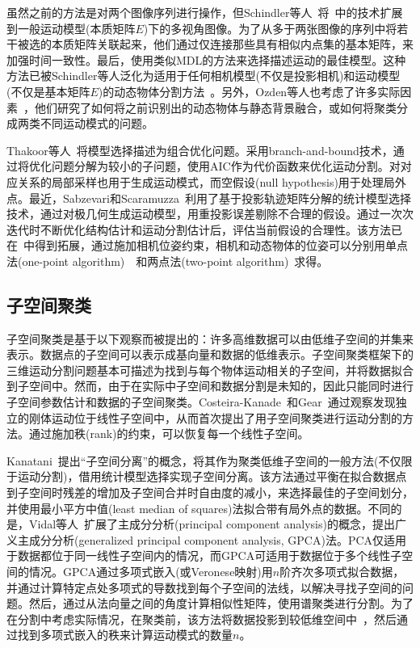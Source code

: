 虽然之前的方法是对两个图像序列进行操作，但Schindler等人~\cite{schindler2006perspective}将~\cite{schindler2005two}中的技术扩展到一般运动模型(本质矩阵$E$)下的多视角图像。为了从多于两张图像的序列中将若干被选的本质矩阵关联起来，他们通过仅连接那些具有相似内点集的基本矩阵，来加强时间一致性。最后，使用类似MDL的方法来选择描述运动的最佳模型。这种方法已被Schindler等人泛化为适用于任何相机模型(不仅是投影相机)和运动模型(不仅是基本矩阵$E$)的动态物体分割方法~\cite{schindler2008model}。另外，Ozden等人也考虑了许多实际因素~\cite{ozden2010multibody}，他们研究了如何将之前识别出的动态物体与静态背景融合，或如何将聚类分成两类不同运动模式的问题。

Thakoor等人~\cite{thakoor2010multibody}将模型选择描述为组合优化问题。采用branch-and-bound技术，通过将优化问题分解为较小的子问题，使用AIC作为代价函数来优化运动分割。对对应关系的局部采样也用于生成运动模式，而空假设(null hypothesis)用于处理局外点。最近，Sabzevari和Scaramuzza~\cite{sabzevari2014monocular}利用了基于投影轨迹矩阵分解的统计模型选择技术，通过对极几何生成运动模型，用重投影误差剔除不合理的假设。通过一次次迭代时不断优化结构估计和运动分割估计后，评估当前假设的合理性。该方法已在~\cite{sabzevari2016multi}中得到拓展，通过施加相机位姿约束，相机和动态物体的位姿可以分别用单点法(one-point algorithm)~\cite{scaramuzza20111}~\cite{scaramuzza2009real}和两点法(two-point algorithm)~\cite{ortin2001indoor}求得。

\subsection{子空间聚类}
子空间聚类是基于以下观察而被提出的：许多高维数据可以由低维子空间的并集来表示。数据点的子空间可以表示成基向量和数据的低维表示。子空间聚类框架下的三维运动分割问题基本可描述为找到与每个物体运动相关的子空间，并将数据拟合到子空间中。然而，由于在实际中子空间和数据分割是未知的，因此只能同时进行子空间参数估计和数据的子空间聚类。Costeira-Kanade~\cite{costeira1998multibody}和Gear~\cite{gear1998multibody}通过观察发现独立的刚体运动位于线性子空间中，从而首次提出了用子空间聚类进行运动分割的方法。通过施加秩(rank)的约束，可以恢复每一个线性子空间。

Kanatani~\cite{kanatani2001motion}提出“子空间分离”的概念，将其作为聚类低维子空间的一般方法(不仅限于运动分割)，借用统计模型选择实现子空间分离。该方法通过平衡在拟合数据点到子空间时残差的增加及子空间合并时自由度的减小，来选择最佳的子空间划分，并使用最小平方中值(least median of squares)法拟合带有局外点的数据。不同的是，Vidal等人~\cite{vidal2005generalized}扩展了主成分分析(principal component analysis)的概念，提出广义主成分分析(generalized principal component analysis, GPCA)法。PCA仅适用于数据都位于同一线性子空间内的情况，而GPCA可适用于数据位于多个线性子空间的情况。GPCA通过多项式嵌入(或Veronese映射)用$n$阶齐次多项式拟合数据，并通过计算特定点处多项式的导数找到每个子空间的法线，以解决寻找子空间的问题。然后，通过从法向量之间的角度计算相似性矩阵，使用谱聚类进行分割。为了在分割中考虑实际情况，在聚类前，该方法将数据投影到较低维空间中~\cite{vidal2005generalized}，然后通过找到多项式嵌入的秩来计算运动模式的数量$n$。

